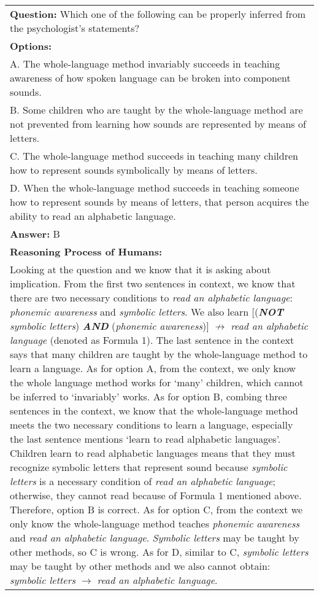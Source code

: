 \documentclass{article} \usepackage{iclr2020_conference,times}
\begin{document}
\begin{table}
\begin{tabular}{|p{\columnwidth}|}
        \textbf{Question: }
        Which one of the following can be properly inferred from the psychologist's statements?\\
        \textbf{Options: } \\
        A. The whole-language method invariably succeeds in teaching awareness of how spoken language can be broken into component sounds.\\
        B. Some children who are taught by the whole-language method are not prevented from learning how sounds are represented by means of letters.\\
        C. The whole-language method succeeds in teaching many children how to represent sounds symbolically by means of letters.\\
        D. When the whole-language method succeeds in teaching someone how to represent sounds by means of letters, that person acquires the ability to read an alphabetic language.\\
        \textbf{Answer: }B\\
        \textbf{Reasoning Process of Humans: }\\
        Looking at the question and we know that it is asking about implication. From the first two sentences in context, we know that there are two necessary conditions to \textit{read an alphabetic language}: \textit{phonemic awareness} and \textit{symbolic letters}. We also learn [(\textit{\textbf{NOT} symbolic letters}) \textit{\textbf{AND}} (\textit{phonemic awareness})] $\not\rightarrow$ \textit{read an alphabetic language} (denoted as Formula 1). The last sentence in the context says that many children are taught by the whole-language method to learn a language. As for option A, from the context, we only know the whole language method works for `many' children, which cannot be inferred to `invariably' works. As for option B, combing three sentences in the context, we know that the whole-language method meets the two necessary conditions to learn a language, especially the last sentence mentions `learn to read alphabetic languages'. Children learn to read alphabetic languages means that they must recognize symbolic letters that represent sound because \textit{symbolic letters} is a necessary condition of \textit{read an alphabetic language}; otherwise, they cannot read because of Formula 1 mentioned above. Therefore, option B is correct. As for option C, from the context we only know the whole-language method teaches \textit{phonemic awareness} and \textit{read an alphabetic language}. \textit{Symbolic letters} may be taught by other methods, so C is wrong. As for D, similar to C, \textit{symbolic letters} may be taught by other methods and we also cannot obtain: \textit{symbolic letters} $\rightarrow$ \textit{read an alphabetic language}. 
        \\
		\hline		
	\end{tabular}
	\label{tab:example_to_solve}
\end{table}
\end{document}
